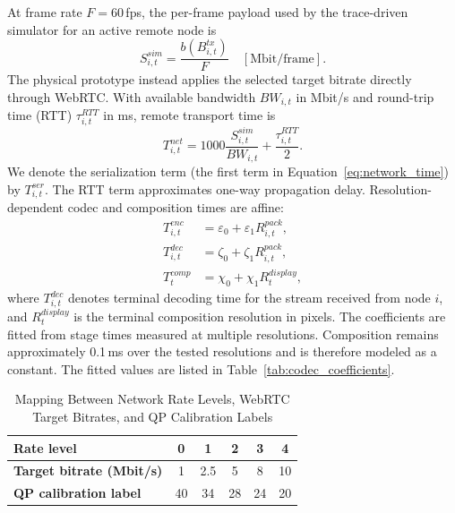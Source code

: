 \documentclass[10pt,journal,compsoc]{IEEEtran}
\begin{document}
At frame rate $F=60$\,fps, the per-frame payload used by the trace-driven simulator for an active remote node is
\begin{equation}
	S^{sim}_{i,t}=\frac{b(B^{tx}_{i,t})}{F}
	\quad[\mathrm{Mbit/frame}].
	\label{eq:payload}
\end{equation}
The physical prototype instead applies the selected target bitrate directly through WebRTC. With available bandwidth $BW_{i,t}$ in Mbit/s and round-trip time (RTT) $\tau^{RTT}_{i,t}$ in ms, remote transport time is
\begin{equation}
	T^{net}_{i,t}=1000\frac{S^{sim}_{i,t}}{BW_{i,t}}+\frac{\tau^{RTT}_{i,t}}{2}.
	\label{eq:network_time}
\end{equation}
We denote the serialization term (the first term in Equation~\ref{eq:network_time}) by $T^{ser}_{i,t}$. The RTT term approximates one-way propagation delay. Resolution-dependent codec and composition times are affine:
\begin{align}
	T^{enc}_{i,t}&=\varepsilon_0+\varepsilon_1R^{pack}_{i,t},\\
	T^{dec}_{i,t}&=\zeta_0+\zeta_1R^{pack}_{i,t},\\
	T^{comp}_{t}&=\chi_0+\chi_1R^{display}_{t},
	\label{eq:codec_comp_time}
\end{align}
where $T^{dec}_{i,t}$ denotes terminal decoding time for the stream received from node $i$, and $R^{display}_{t}$ is the terminal composition resolution in pixels. The coefficients are fitted from stage times measured at multiple resolutions. Composition remains approximately 0.1\,ms over the tested resolutions and is therefore modeled as a constant. The fitted values are listed in Table~\ref{tab:codec_coefficients}.

\begin{table}[t]
	\centering
	\caption{Mapping Between Network Rate Levels, WebRTC Target Bitrates, and QP Calibration Labels}
	\label{tab:qp_rate_map}
	\footnotesize
	\renewcommand{\arraystretch}{1.05}
	\begin{tabular*}{\columnwidth}{@{\extracolsep{\fill}}lccccc@{}}
		\toprule
		\textbf{Rate level} & 0 & 1 & 2 & 3 & 4 \\
		\midrule
		\textbf{Target bitrate (Mbit/s)} & 1 & 2.5 & 5 & 8 & 10 \\
		\textbf{QP calibration label} & 40 & 34 & 28 & 24 & 20 \\
		\bottomrule
	\end{tabular*}
\end{table}
\end{document}
